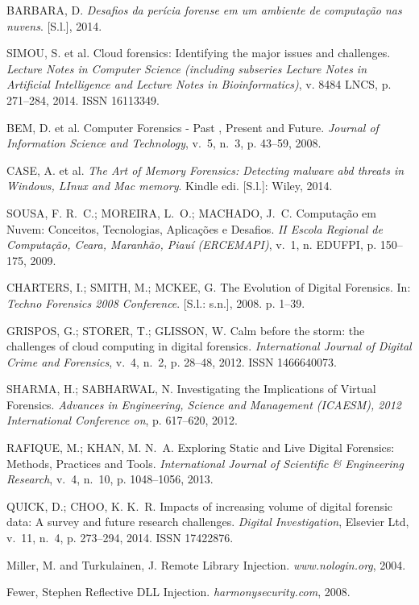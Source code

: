 \documentclass[conference]{IEEEtran}
\begin{document}
\begin{thebibliography}{1}
{BARBARA, D. \emph{{Desafios da per{\'{i}}cia forense em um ambiente de
  computa{\c{c}}{\~{a}}o nas nuvens}}.
[S.l.], 2014.}

{SIMOU, S. et al. {Cloud forensics: Identifying the major issues and
  challenges}.
\emph{Lecture Notes in Computer Science (including subseries Lecture Notes in
  Artificial Intelligence and Lecture Notes in Bioinformatics)}, v. 8484 LNCS,
  p. 271--284, 2014.
ISSN 16113349.}

{BEM, D. et al. {Computer Forensics - Past , Present and Future}.
\emph{Journal of Information Science and Technology}, v.~5, n.~3, p. 43--59,
  2008.}
  
{CASE, A. et al. \emph{{The Art of Memory Forensics: Detecting malware abd
  threats in Windows, LInux and Mac memory}}. Kindle edi. [S.l.]: Wiley, 2014.}
  
{SOUSA, F. R.~C.; MOREIRA, L.~O.; MACHADO, J.~C. {Computa{\c{c}}{\~{a}}o em
  Nuvem: Conceitos, Tecnologias, Aplica{\c{c}}{\~{o}}es e Desafios}.
\emph{II Escola Regional de Computa{\c{c}}{\~{a}}o, Ceara, Maranh{\~{a}}o,
  Piau{\'{i}} (ERCEMAPI)}, v.~1, n. EDUFPI, p. 150--175, 2009.}
  
{CHARTERS, I.; SMITH, M.; MCKEE, G. {The Evolution of Digital Forensics}. In:
  \emph{Techno Forensics 2008 Conference}. [S.l.: s.n.], 2008. p. 1--39.}

{GRISPOS, G.; STORER, T.; GLISSON, W. {Calm before the storm: the challenges of
  cloud computing in digital forensics}.
\emph{International Journal of Digital Crime and Forensics}, v.~4, n.~2, p.
  28--48, 2012.
ISSN 1466640073.}

{SHARMA, H.; SABHARWAL, N. {Investigating the Implications of Virtual
  Forensics}.
\emph{Advances in Engineering, Science and Management (ICAESM), 2012
  International Conference on}, p. 617--620, 2012.}
  
{RAFIQUE, M.; KHAN, M. N.~A. {Exploring Static and Live Digital Forensics:
  Methods, Practices and Tools}.
\emph{International Journal of Scientific {\&} Engineering Research}, v.~4,
  n.~10, p. 1048--1056, 2013.}
  
{QUICK, D.; CHOO, K. K.~R. {Impacts of increasing volume of digital forensic
  data: A survey and future research challenges}.
\emph{Digital Investigation}, Elsevier Ltd, v.~11, n.~4, p. 273--294, 2014.
ISSN 17422876.}

{Miller, M. and Turkulainen, J. {Remote Library Injection}.
\emph{www.nologin.org}, 2004. }

{Fewer, Stephen {Reflective DLL Injection}.
\emph{harmonysecurity.com}, 2008. }

\end{thebibliography}

\end{document}
